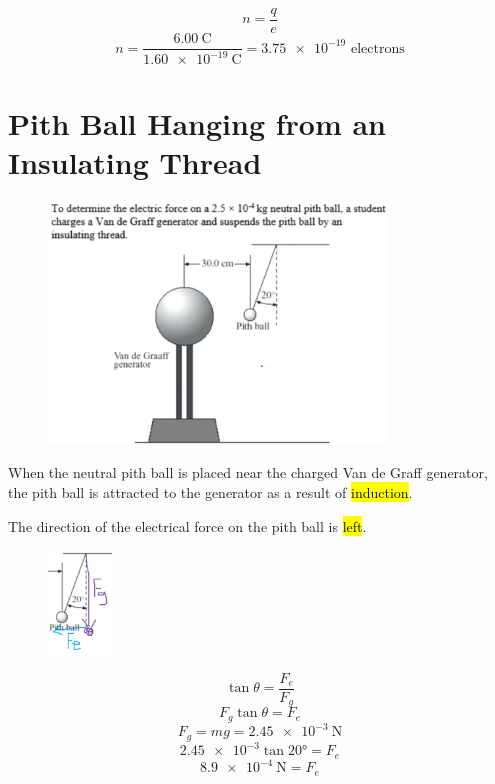 \documentclass[a4paper,12pt]{article}
\begin{document}
$$n = \frac{q}{e}$$
$$n = \frac{\SI{6.00}{\coulomb}}{\SI{1.60e-19}{\coulomb}} = \num{3.75e-19}\textrm{ electrons}$$

\section{Pith Ball Hanging from an Insulating Thread}
\begin{figure}[H]
    \centering
    \includegraphics[width=0.8\textwidth]{pith}
\end{figure}

When the neutral pith ball is placed near the charged Van de Graff generator, the pith ball is attracted to the generator as a result of \hl{induction}.

The direction of the electrical force on the pith ball is \hl{left}.

\begin{figure}[H]
    \centering
    \includegraphics[width=0.15\textwidth]{pithforces}
\end{figure}
$$\tan{\theta} = \frac{F_e}{F_g}$$
$$F_g\tan{\theta} = F_e$$
$$F_g = mg = \SI{2.45e-3}{\newton}$$
$$\num{2.45e-3}\tan{\ang{20}} = F_e$$
$$\SI{8.9e-4}{\newton} = F_e$$
\end{document}
